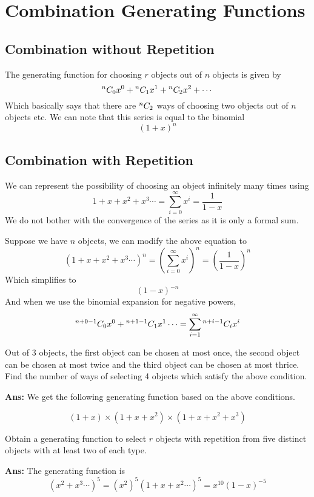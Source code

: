 \section{Combination Generating Functions}

\subsection{Combination without Repetition}

The generating function for choosing \mbox{$r$} objects out of \mbox{$n$} objects is given by
\[
    {}^{n}C_{0}x^0 + {}^{n}C_{1}x^1 + {}^{n}C_{2}x^2 + \cdots
\]
Which basically says that there are \mbox{${}^{n}C_{2}$} ways of choosing two objects out of \mbox{$n$} objects etc.
We can note that this series is equal to the binomial
\[
    {(1+x)}^n
\]

\subsection{Combination with Repetition}
We can represent the possibility of choosing an object infinitely many times using
\[
    1+x+x^2+x^3\cdots = \sum_{i=0}^{\infty} x^i = \frac{1}{1-x}
\]
We do not bother with the convergence of the series as it is only a formal sum.

Suppose we have \mbox{$n$} objects, we can modify the above equation to
\[
    {(1+x+x^2+x^3\cdots)}^n = {(\sum_{i=0}^{\infty} x^i)}^n = {\left(\frac{1}{1-x}\right)}^n
\]
Which simplifies to
\[
    {(1-x)}^{-n}
\]
And when we use the binomial expansion for negative powers,
\[
    {}^{n+0-1}C_{0}x^0+{}^{n+1-1}C_{1}x^1\cdots = \sum_{i=1}^{\infty}{}^{n+i-1}C_{i}x^i
\]
\begin{example}
    Out of 3 objects, the first object can be chosen at most once, the second object can be chosen at most twice and the third object can be chosen at most thrice. Find the number of ways of selecting 4 objects which satisfy the above condition.

    \textbf{Ans:} We get the following generating function based on the above conditions.

    \[
        (1+x) \times (1+x+x^2) \times (1+x+x^2+x^3)
    \]
\end{example}

\begin{example}
    Obtain a generating function to select \mbox{$r$} objects with repetition from five distinct objects with at least two of each type.

    \textbf{Ans:} The generating function is
    \[
        {(x^2+x^3\cdots)}^5 = {(x^2)}^5 {(1+x+x^2\cdots)}^5 = x^{10} {(1-x)}^{-5}
    \]
\end{example}


